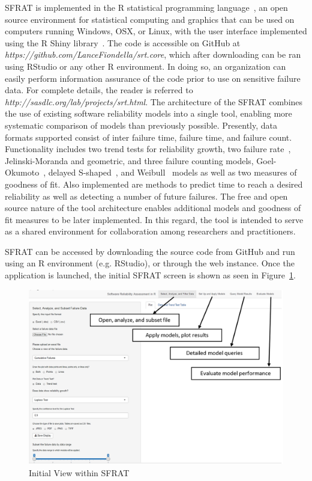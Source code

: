 \documentclass[conference]{IEEEtran}
\begin{document}
SFRAT is implemented in the R statistical programming language~\cite{}, an open source environment for statistical computing and graphics that can be used on computers running Windows, OSX, or Linux, with the user interface implemented using the R Shiny library~\cite{}. The code is accessible on GitHub at \textit{https://github.com/LanceFiondella/srt.core}, which after downloading can be ran using RStudio or any other R environment. In doing so, an organization can easily perform information assurance of the code prior to use on sensitive failure data. For complete details, the reader is referred to \textit{http://sasdlc.org/lab/projects/srt.html}.
The architecture of the SFRAT combines the use of existing software reliability models into a single tool, enabling more systematic comparison of models than previously possible. Presently, data formats supported consist of inter failure time, failure time, and failure count. Functionality includes two trend tests for reliability growth, two failure rate~\cite{BookHoSRE}, Jelinski-Moranda and geometric, and three failure counting models, Goel-Okumoto~\cite{goel1985software}, delayed S-shaped~\cite{artTR1986_19}, and Weibull~\cite{artNHPPsurvey} models as well as two measures of goodness of fit. Also implemented are methods to predict time to reach a desired reliability as well as detecting a number of future failures. The free and open source nature of the tool architecture enables additional models and goodness of fit measures to be later implemented. In this regard, the tool is intended to serve as a shared environment for collaboration among researchers and practitioners.

SFRAT can be accessed by downloading the source code from GitHub and run using an R environment (e.g. RStudio), or through the web instance. Once the application is launched, the initial SFRAT screen is shown as seen in Figure~\ref{fig_DefaultView}.
\begin{figure}[!h]
\centering
\includegraphics[width=\columnwidth]{Figures/DefaultView}
\caption{Initial View within SFRAT}
\label{fig_DefaultView}
\end{figure}
\end{document}
